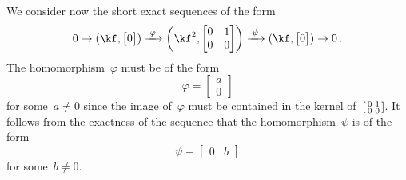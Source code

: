 \documentclass[a4paper,11pt]{scrartcl}
\begin{document}
We consider now the short exact sequences of the form
\begin{equation}
  \label{nonsplit ses}
  0
  \to
  (\kf, \begin{bmatrix} 0 \end{bmatrix})
  \xlongto{\varphi}
  \biggl( \kf^2, \begin{bmatrix} 0 & 1 \\ 0 & 0 \end{bmatrix} \biggr)
  \xlongto{\psi}
  (\kf, \begin{bmatrix} 0 \end{bmatrix})
  \to
  0 \,.
\end{equation}
The homomorphism~$\varphi$ must be of the form
\[
  \varphi
  =
  \begin{bmatrix}
    a \\
    0
  \end{bmatrix}
\]
for some~$a \neq 0$ since the image of~$\varphi$ must be contained in the kernel of~$\begin{bsmallmatrix} 0 & 1 \\ 0 & 0 \end{bsmallmatrix}$.
It follows from the exactness of the sequence that the homomorphism~$\psi$ is of the form
\[
  \psi
  =
  \begin{bmatrix}
    0 & b
  \end{bmatrix}
\]
for some~$b \neq 0$.
\end{document}
